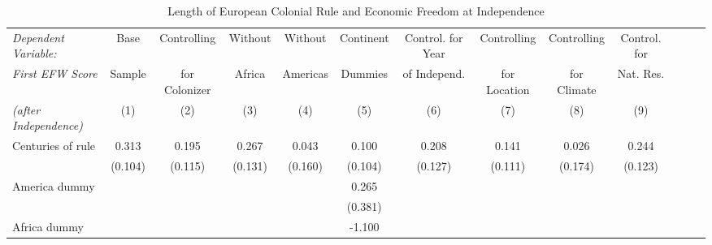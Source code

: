 \begin{sidewaystable}[h!]
\begin{threeparttable}
\begin{center}
\begin{minipage}{\textwidth}
\small
\caption{Length of European Colonial Rule and Economic Freedom at Independence}
\label{tab:Tab6}
\begin{tabular*}{\textwidth}{@{\extracolsep{\fill}}lcccccccccccc@{\extracolsep{\fill}}}
\hline\hline
            \textit{Dependent Variable:}&\multicolumn{1}{c}{Base}&\multicolumn{1}{c}{Controlling}&\multicolumn{1}{c}{Without}&\multicolumn{1}{c}{Without}&\multicolumn{1}{c}{Continent}&\multicolumn{1}{c}{Control. for Year}&\multicolumn{1}{c}{Controlling}&\multicolumn{1}{c}{Controlling}&\multicolumn{1}{c}{Control. for}\\
            \textit{First EFW Score}&\multicolumn{1}{c}{Sample}&\multicolumn{1}{c}{for Colonizer}&\multicolumn{1}{c}{Africa}&\multicolumn{1}{c}{Americas}&\multicolumn{1}{c}{Dummies}&\multicolumn{1}{c}{of Independ.}&\multicolumn{1}{c}{for Location}&\multicolumn{1}{c}{for Climate}&\multicolumn{1}{c}{Nat. Res.}\\
             \textit{(after Independence)}&\multicolumn{1}{c}{(1)}&\multicolumn{1}{c}{(2)}&\multicolumn{1}{c}{(3)}&\multicolumn{1}{c}{(4)}&\multicolumn{1}{c}{(5)}&\multicolumn{1}{c}{(6)}&\multicolumn{1}{c}{(7)}&\multicolumn{1}{c}{(8)}&\multicolumn{1}{c}{(9)}\\
\hline
Centuries of rule &       0.313\sym{***}&       0.195\sym{*}  &       0.267\sym{*}  &      0.043         &      0.100         &       0.208         &       0.141         &      0.026         &       0.244\sym{*}  \\
            &     (0.104)         &     (0.115)         &     (0.131)         &     (0.160)         &     (0.104)         &     (0.127)         &     (0.111)         &     (0.174)         &     (0.123)         \\
[0.125em]
America dummy     &                     &                     &                     &                     &       0.265         &                     &                     &                     &                     \\
            &                     &                     &                     &                     &     (0.381)         &                     &                     &                     &                     \\
[0.125em]
Africa dummy      &                     &                     &                     &                     &      -1.100\sym{***}&                     &                     &                     &                     \\

\end{tabular*}
\end{minipage}
\end{center}
\end{threeparttable}
\end{sidewaystable}

